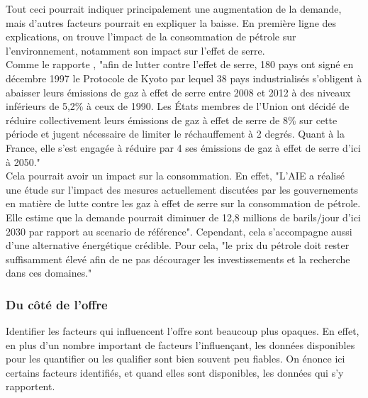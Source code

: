 \bigskip
Tout ceci pourrait indiquer principalement une augmentation de la demande, mais d’autres facteurs pourrait en expliquer la baisse. En première ligne des explications, on trouve l’impact de la consommation de pétrole sur l’environnement, notamment son impact sur l’effet de serre.\\
Comme le rapporte \cite{rapSenat}, "afin de lutter contre l’effet de serre, 180 pays ont signé en décembre 1997 le Protocole de Kyoto par lequel 38 pays industrialisés s’obligent à abaisser leurs émissions de gaz à effet de serre entre 2008 et 2012 à des niveaux inférieurs de 5,2\% à ceux de 1990. Les États membres de l’Union ont décidé de réduire collectivement leurs émissions de gaz à effet de serre de 8\% sur cette période et jugent nécessaire de limiter le réchauffement à 2 degrés. Quant à la France, elle s’est engagée à réduire par 4 ses émissions de gaz à effet de serre d’ici à 2050."\\
Cela pourrait avoir un impact sur la consommation. En effet, "L’AIE a réalisé une étude sur l’impact des mesures actuellement discutées par les gouvernements en matière de lutte contre les gaz à effet de serre sur la consommation de pétrole. Elle estime que la demande pourrait diminuer de 12,8 millions de barils/jour d’ici 2030 par rapport au scenario de référence". Cependant, cela s’accompagne aussi d’une alternative énergétique crédible. Pour cela, "le prix du pétrole doit rester suffisamment élevé afin de ne pas décourager les investissements et la recherche dans ces domaines."

\subsubsection{Du côté de l’offre}
Identifier les facteurs qui influencent l’offre sont beaucoup plus opaques. En effet, en plus d’un nombre important de facteurs l’influençant, les données disponibles pour les quantifier ou les qualifier sont bien souvent peu fiables. On énonce ici certains facteurs identifiés, et quand elles sont disponibles, les données qui s’y rapportent.

